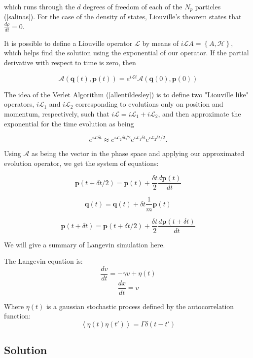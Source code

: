 which runs through the $d$ degrees of freedom of each of the $N_p$ particles ([salinas]). For the case of the density of states, Liouville's theorem states that $\frac{d \rho}{dt} = 0$.

It is possible to define a Liouville operator $\mathcal{L}$ by means of $i\mathcal{L}A = \left\{A,\mathcal{H}\right\}$, which helps find the solution using the exponential of our operator. If the partial derivative with respect to time is zero, then

$$\mathcal{A}(\mathbf{q}(t), \mathbf{p}(t)) = e^{i\mathcal{L}t} \mathcal{A}(\mathbf{q}(0), \mathbf{p}(0))$$

The idea of the Verlet Algorithm ([allentildesley]) is to define two "Liouville like" operators, $i\mathcal{L}_1$ and $i\mathcal{L}_2$ corresponding to evolutions only on position and momentum, respectively, such that $i\mathcal{L} = i\mathcal{L}_1 + i\mathcal{L}_2$, and then approximate the exponential for the time evolution as being

$$e^{i\mathcal{L}\delta t} \approx e^{i\mathcal{L}_2\delta t/2}e^{i\mathcal{L}_1\delta t}e^{i\mathcal{L}_2\delta t/2} .$$

Using $\mathcal{A}$ as being the vector in the phase space and applying our approximated evolution operator, we get the system of equations:

$$\mathbf{p}(t+\delta t/2) = \mathbf{p}(t) + \frac{\delta t}{2}\frac{d \mathbf{p}(t)}{dt}$$

$$\mathbf{q}(t) = \mathbf{q}(t) + \delta t \frac{1}{m}\mathbf{p}(t)  $$

$$\mathbf{p}(t+\delta t) = \mathbf{p}(t+\delta t/2) + \frac{\delta t}{2}\frac{d \mathbf{p}(t+\delta t)}{dt}$$




We will give a summary of Langevin simulation here. 

The Langevin equation is:
\[
\boxed{\frac{dv}{dt} = -\gamma v + \eta\left(t\right)}
\]
$$ \frac{dx}{dt} = v $$

Where $\eta\left(t\right)$ is a gaussian stochastic process defined by the autocorrelation function:
$$ \left< \eta\left(t\right) \eta\left(t'\right)\right> = \Gamma \delta\left(t - t'\right) $$

\subsection{Solution} 

